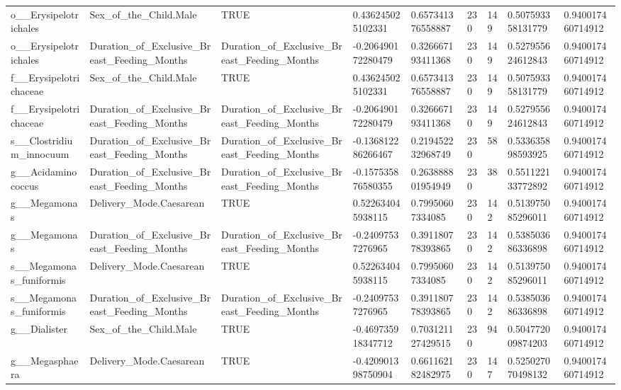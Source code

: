 \begin{longtable}{lllllllll}
o\_\_Erysipelotrichales & Sex\_of\_the\_Child.Male & TRUE & 0.436245025102331 & 0.657341376558887 & 230 & 149 & 0.507593358131779 & 0.940017460714912 \\
o\_\_Erysipelotrichales & Duration\_of\_Exclusive\_Breast\_Feeding\_Months & Duration\_of\_Exclusive\_Breast\_Feeding\_Months & -0.206490172280479 & 0.326667193411368 & 230 & 149 & 0.527955624612843 & 0.940017460714912 \\
f\_\_Erysipelotrichaceae & Sex\_of\_the\_Child.Male & TRUE & 0.436245025102331 & 0.657341376558887 & 230 & 149 & 0.507593358131779 & 0.940017460714912 \\
f\_\_Erysipelotrichaceae & Duration\_of\_Exclusive\_Breast\_Feeding\_Months & Duration\_of\_Exclusive\_Breast\_Feeding\_Months & -0.206490172280479 & 0.326667193411368 & 230 & 149 & 0.527955624612843 & 0.940017460714912 \\
s\_\_Clostridium\_innocuum & Duration\_of\_Exclusive\_Breast\_Feeding\_Months & Duration\_of\_Exclusive\_Breast\_Feeding\_Months & -0.136812286266467 & 0.219452232968749 & 230 & 58 & 0.533635898593925 & 0.940017460714912 \\
g\_\_Acidaminococcus & Duration\_of\_Exclusive\_Breast\_Feeding\_Months & Duration\_of\_Exclusive\_Breast\_Feeding\_Months & -0.157535876580355 & 0.263888801954949 & 230 & 38 & 0.551122133772892 & 0.940017460714912 \\
g\_\_Megamonas & Delivery\_Mode.Caesarean & TRUE & 0.522634045938115 & 0.79950607334085 & 230 & 142 & 0.513975085296011 & 0.940017460714912 \\
g\_\_Megamonas & Duration\_of\_Exclusive\_Breast\_Feeding\_Months & Duration\_of\_Exclusive\_Breast\_Feeding\_Months & -0.24097537276965 & 0.391180778393865 & 230 & 142 & 0.538503686336898 & 0.940017460714912 \\
s\_\_Megamonas\_funiformis & Delivery\_Mode.Caesarean & TRUE & 0.522634045938115 & 0.79950607334085 & 230 & 142 & 0.513975085296011 & 0.940017460714912 \\
s\_\_Megamonas\_funiformis & Duration\_of\_Exclusive\_Breast\_Feeding\_Months & Duration\_of\_Exclusive\_Breast\_Feeding\_Months & -0.24097537276965 & 0.391180778393865 & 230 & 142 & 0.538503686336898 & 0.940017460714912 \\
g\_\_Dialister & Sex\_of\_the\_Child.Male & TRUE & -0.469735918347712 & 0.703121127429515 & 230 & 94 & 0.504772009874203 & 0.940017460714912 \\
g\_\_Megasphaera & Delivery\_Mode.Caesarean & TRUE & -0.420901398750904 & 0.661162182482975 & 230 & 147 & 0.525027070498132 & 0.940017460714912 \\

\end{longtable}
